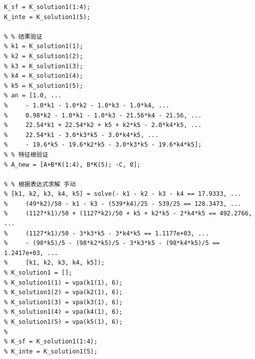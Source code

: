 \documentclass[UTF8]{article}
\begin{document}
\begin{lstlisting}
K_sf = K_solution1(1:4);
K_inte = K_solution1(5);

% % 结果验证
% k1 = K_solution1(1);
% k2 = K_solution1(2);
% k3 = K_solution1(3);
% k4 = K_solution1(4);
% k5 = K_solution1(5);
% an = [1.0, ...
%     - 1.0*k1 - 1.0*k2 - 1.0*k3 - 1.0*k4, ...
%     0.98*k2 - 1.0*k1 - 1.0*k3 - 21.56*k4 - 21.56, ...
%     22.54*k1 + 22.54*k2 + k5 + k2*k5 - 2.0*k4*k5, ...
%     22.54*k1 - 3.0*k3*k5 - 3.0*k4*k5, ...
%     - 19.6*k5 - 19.6*k2*k5 - 3.0*k3*k5 - 19.6*k4*k5];
% % 特征根验证
% A_new = [A+B*K(1:4), B*K(5); -C, 0];

% % 根据表达式求解 手动
% [k1, k2, k3, k4, k5] = solve(- k1 - k2 - k3 - k4 == 17.9333, ...
%     (49*k2)/50 - k1 - k3 - (539*k4)/25 - 539/25 == 128.3473, ...
%     (1127*k1)/50 + (1127*k2)/50 + k5 + k2*k5 - 2*k4*k5 == 492.2766, ...
%     (1127*k1)/50 - 3*k3*k5 - 3*k4*k5 == 1.1177e+03, ...
%     - (98*k5)/5 - (98*k2*k5)/5 - 3*k3*k5 - (98*k4*k5)/5 == 1.2417e+03, ...
%     [k1, k2, k3, k4, k5]);
% K_solution1 = [];
% K_solution1(1) = vpa(k1(1), 6);
% K_solution1(2) = vpa(k2(1), 6);
% K_solution1(3) = vpa(k3(1), 6);
% K_solution1(4) = vpa(k4(1), 6);
% K_solution1(5) = vpa(k5(1), 6);
% 
% K_sf = K_solution1(1:4);
% K_inte = K_solution1(5);
\end{lstlisting}

\newpage
%
\end{document}

